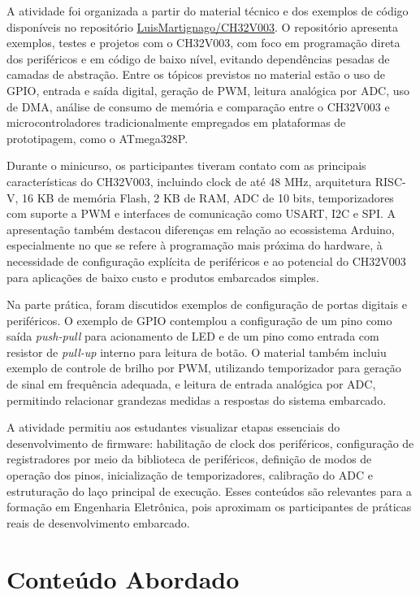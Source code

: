 \documentclass[12pt,a4paper]{article}
\begin{document}
A atividade foi organizada a partir do material técnico e dos exemplos de código disponíveis no repositório \href{https://github.com/LuisMartignago/CH32V003}{LuisMartignago/CH32V003}. O repositório apresenta exemplos, testes e projetos com o CH32V003, com foco em programação direta dos periféricos e em código de baixo nível, evitando dependências pesadas de camadas de abstração. Entre os tópicos previstos no material estão o uso de GPIO, entrada e saída digital, geração de PWM, leitura analógica por ADC, uso de DMA, análise de consumo de memória e comparação entre o CH32V003 e microcontroladores tradicionalmente empregados em plataformas de prototipagem, como o ATmega328P.

Durante o minicurso, os participantes tiveram contato com as principais características do CH32V003, incluindo clock de até 48 MHz, arquitetura RISC-V, 16 KB de memória Flash, 2 KB de RAM, ADC de 10 bits, temporizadores com suporte a PWM e interfaces de comunicação como USART, I2C e SPI. A apresentação também destacou diferenças em relação ao ecossistema Arduino, especialmente no que se refere à programação mais próxima do hardware, à necessidade de configuração explícita de periféricos e ao potencial do CH32V003 para aplicações de baixo custo e produtos embarcados simples.

Na parte prática, foram discutidos exemplos de configuração de portas digitais e periféricos. O exemplo de GPIO contemplou a configuração de um pino como saída \textit{push-pull} para acionamento de LED e de um pino como entrada com resistor de \textit{pull-up} interno para leitura de botão. O material também incluiu exemplo de controle de brilho por PWM, utilizando temporizador para geração de sinal em frequência adequada, e leitura de entrada analógica por ADC, permitindo relacionar grandezas medidas a respostas do sistema embarcado.

A atividade permitiu aos estudantes visualizar etapas essenciais do desenvolvimento de firmware: habilitação de clock dos periféricos, configuração de registradores por meio da biblioteca de periféricos, definição de modos de operação dos pinos, inicialização de temporizadores, calibração do ADC e estruturação do laço principal de execução. Esses conteúdos são relevantes para a formação em Engenharia Eletrônica, pois aproximam os participantes de práticas reais de desenvolvimento embarcado.

\section{Conteúdo Abordado}
\end{document}
